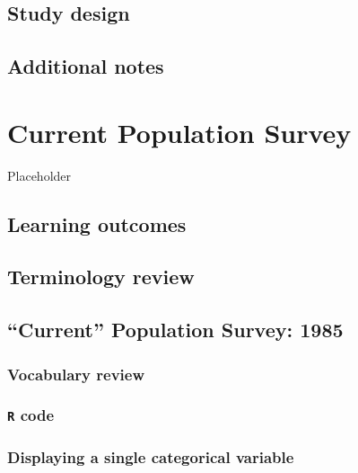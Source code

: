 \documentclass[
]{report}
\begin{document}
\hypertarget{study-design-1}{%
\section{Study design}\label{study-design-1}}

\hypertarget{additional-notes}{%
\section{Additional notes}\label{additional-notes}}

\hypertarget{current-population-survey}{%
\chapter{Current Population Survey}\label{current-population-survey}}

Placeholder

\hypertarget{learning-outcomes}{%
\section{Learning outcomes}\label{learning-outcomes}}

\hypertarget{terminology-review}{%
\section{Terminology review}\label{terminology-review}}

\hypertarget{current-population-survey-1985}{%
\section{``Current'' Population Survey: 1985}\label{current-population-survey-1985}}

\hypertarget{vocabulary-review}{%
\subsection{Vocabulary review}\label{vocabulary-review}}

\hypertarget{r-code}{%
\subsection{\texorpdfstring{\texttt{R} code}{R code}}\label{r-code}}

\hypertarget{displaying-a-single-categorical-variable}{%
\subsection{Displaying a single categorical variable}\label{displaying-a-single-categorical-variable}}
\end{document}
